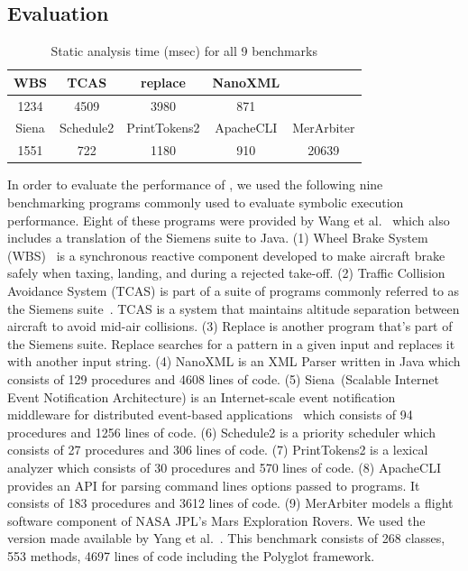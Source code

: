 \subsection{Evaluation}
\begin{table}[h]
    \begin{tabular}{@{}ccccc@{}}
        \toprule
        WBS   & TCAS      & replace      & NanoXML   &            \\ \midrule
        1234  & 4509      & 3980         & 871       &            \\ \midrule
        Siena & Schedule2 & PrintTokens2 & ApacheCLI & MerArbiter \\ \midrule
        1551  & 722       & 1180         & 910       & 20639      \\ \bottomrule
    \end{tabular}
    \caption{Static analysis time (msec) for all 9 benchmarks}
    \label{table:static-analysis-time}
\end{table}
%
In order to evaluate the performance of \tool, we used the following nine benchmarking programs commonly used to
evaluate symbolic execution performance.
%
Eight of these programs were provided by Wang et al.~\cite{dgse} which also includes a translation of the
Siemens suite to Java.
%
(1) Wheel Brake System (WBS)~\cite{yang2014directed} is a synchronous reactive
component developed to make aircraft brake safely when taxing, landing, and during a rejected take-off.
%
(2) Traffic Collision Avoidance System (TCAS) is part of a suite of programs commonly referred to as the Siemens
suite~\cite{siemens-benchmarks}. TCAS is a system that maintains altitude separation between aircraft to avoid mid-air
collisions.
%
(3) Replace is another program that\rq s part of the Siemens suite. Replace searches for a pattern in a given input and
replaces it with another input string.
%
(4) NanoXML is an XML Parser written in Java which consists of 129 procedures and 4608 lines of code.
%
(5) Siena~(Scalable Internet Event Notification Architecture) is an Internet-scale event notification middleware for
distributed event-based applications~\cite{siena} which consists of 94 procedures and 1256 lines of code.
%
(6) Schedule2 is a priority scheduler which consists of 27 procedures and 306 lines of code.
%
(7) PrintTokens2 is a lexical analyzer which consists of 30 procedures and 570 lines of code.
%
(8) ApacheCLI~\cite{apachecli} provides an API for parsing command lines options passed to programs.
It consists of 183 procedures and 3612 lines of code.
%
(9) MerArbiter models a flight software component of NASA JPL\rq s Mars Exploration Rovers.
%
%
We used the version made
available by Yang et al.~\cite{memoise}. This benchmark consists of 268 classes, 553 methods, 4697 lines of code
including the Polyglot framework.

